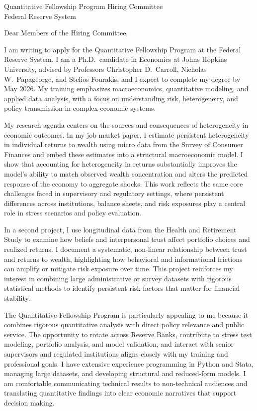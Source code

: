 \documentclass[11pt,letterpaper]{letter}
\begin{document}
\begin{letter}{
Quantitative Fellowship Program Hiring Committee \\
Federal Reserve System
}

\opening{Dear Members of the Hiring Committee,}

I am writing to apply for the Quantitative Fellowship Program at the Federal Reserve System. I am a Ph.D.\ candidate in Economics at Johns Hopkins University, advised by Professors Christopher D.~Carroll, Nicholas W.~Papageorge, and Stelios Fourakis, and I expect to complete my degree by May 2026. My training emphasizes macroeconomics, quantitative modeling, and applied data analysis, with a focus on understanding risk, heterogeneity, and policy transmission in complex economic systems.

My research agenda centers on the sources and consequences of heterogeneity in economic outcomes. In my job market paper, I estimate persistent heterogeneity in individual returns to wealth using micro data from the Survey of Consumer Finances and embed these estimates into a structural macroeconomic model. I show that accounting for heterogeneity in returns substantially improves the model’s ability to match observed wealth concentration and alters the predicted response of the economy to aggregate shocks. This work reflects the same core challenges faced in supervisory and regulatory settings, where persistent differences across institutions, balance sheets, and risk exposures play a central role in stress scenarios and policy evaluation.

In a second project, I use longitudinal data from the Health and Retirement Study to examine how beliefs and interpersonal trust affect portfolio choices and realized returns. I document a systematic, non-linear relationship between trust and returns to wealth, highlighting how behavioral and informational frictions can amplify or mitigate risk exposure over time. This project reinforces my interest in combining large administrative or survey datasets with rigorous statistical methods to identify persistent risk factors that matter for financial stability.

The Quantitative Fellowship Program is particularly appealing to me because it combines rigorous quantitative analysis with direct policy relevance and public service. The opportunity to rotate across Reserve Banks, contribute to stress test modeling, portfolio analysis, and model validation, and interact with senior supervisors and regulated institutions aligns closely with my training and professional goals. I have extensive experience programming in Python and Stata, managing large datasets, and developing structural and reduced-form models. I am comfortable communicating technical results to non-technical audiences and translating quantitative findings into clear economic narratives that support decision making.


\end{letter}
\end{document}
